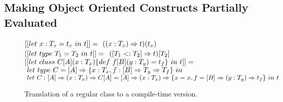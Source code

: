 \subsection{Making Object Oriented Constructs Partially Evaluated}
\label{sct:promotion}

\begin{figure}
  $ [[ let\ x: T_x = t_x\ in\ t ]] = \\ $
  $ ((x: T_x) \Rightarrow t)(t_x) \\ \\$
  $ [[ let\ type\ T_1 = T_2\ in\ t ]] = \\ $
  $ ([T_1 <: T_2] \Rightarrow t)[T_2] \\ \\ $
  $ [[ let\ class\ C[A](x: T_x) \{ def\ f[B](y: T_y) = t_f \}\ in\ t ]] = \\ $
  $ \ let\ type\  C = [A] \Rightarrow \{ x: T_x, f: [B] \Rightarrow T_y \Rightarrow T_f \}\ in \\ $
  $ \ let\ C: [A] \Rightarrow (x: T_x) \Rightarrow C[A] = [A] \Rightarrow (x: T_x) \Rightarrow \{ x = x, f = [B] \Rightarrow (y: T_y) \Rightarrow t_f \}\ in\ t$
\end{figure}

\begin{figure}
\begin{multicols}{2}[]



    {\Pi \ts {}}

    {\Pi \ts {}}

    {\Pi \ts {}}

\end{multicols}
\vspace{4pt}

    {\Pi \ts {}}

    {\Pi \ts {}}

    {\Pi \ts {}}

\caption{Translation of a regular class to a compile-time version.}
\label{fig:partial-evaluation}
\end{figure}
